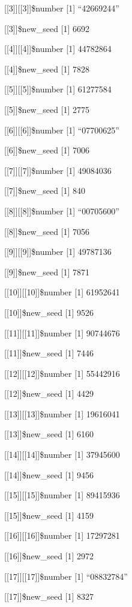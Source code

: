 \documentclass[]{article}
\begin{document}
{[}{[}3{]}{]}{[}{[}3{]}{]}\$number {[}1{]} ``42669244''

{[}{[}3{]}{]}\$new\_seed {[}1{]} 6692

{[}{[}4{]}{]}{[}{[}4{]}{]}\$number {[}1{]} 44782864

{[}{[}4{]}{]}\$new\_seed {[}1{]} 7828

{[}{[}5{]}{]}{[}{[}5{]}{]}\$number {[}1{]} 61277584

{[}{[}5{]}{]}\$new\_seed {[}1{]} 2775

{[}{[}6{]}{]}{[}{[}6{]}{]}\$number {[}1{]} ``07700625''

{[}{[}6{]}{]}\$new\_seed {[}1{]} 7006

{[}{[}7{]}{]}{[}{[}7{]}{]}\$number {[}1{]} 49084036

{[}{[}7{]}{]}\$new\_seed {[}1{]} 840

{[}{[}8{]}{]}{[}{[}8{]}{]}\$number {[}1{]} ``00705600''

{[}{[}8{]}{]}\$new\_seed {[}1{]} 7056

{[}{[}9{]}{]}{[}{[}9{]}{]}\$number {[}1{]} 49787136

{[}{[}9{]}{]}\$new\_seed {[}1{]} 7871

{[}{[}10{]}{]}{[}{[}10{]}{]}\$number {[}1{]} 61952641

{[}{[}10{]}{]}\$new\_seed {[}1{]} 9526

{[}{[}11{]}{]}{[}{[}11{]}{]}\$number {[}1{]} 90744676

{[}{[}11{]}{]}\$new\_seed {[}1{]} 7446

{[}{[}12{]}{]}{[}{[}12{]}{]}\$number {[}1{]} 55442916

{[}{[}12{]}{]}\$new\_seed {[}1{]} 4429

{[}{[}13{]}{]}{[}{[}13{]}{]}\$number {[}1{]} 19616041

{[}{[}13{]}{]}\$new\_seed {[}1{]} 6160

{[}{[}14{]}{]}{[}{[}14{]}{]}\$number {[}1{]} 37945600

{[}{[}14{]}{]}\$new\_seed {[}1{]} 9456

{[}{[}15{]}{]}{[}{[}15{]}{]}\$number {[}1{]} 89415936

{[}{[}15{]}{]}\$new\_seed {[}1{]} 4159

{[}{[}16{]}{]}{[}{[}16{]}{]}\$number {[}1{]} 17297281

{[}{[}16{]}{]}\$new\_seed {[}1{]} 2972

{[}{[}17{]}{]}{[}{[}17{]}{]}\$number {[}1{]} ``08832784''

{[}{[}17{]}{]}\$new\_seed {[}1{]} 8327
\end{document}
